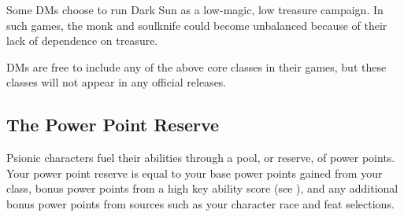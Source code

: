 Some DMs choose to run {\tableheader Dark Sun} as a low-magic, low treasure campaign. In such games, the monk and soulknife could become unbalanced because of their lack of dependence on treasure.

DMs are free to include any of the above core classes in their games, but these classes will not appear in any official releases.

\subsection{The Power Point Reserve}
Psionic characters fuel their abilities through a pool, or reserve, of power points. Your power point reserve is equal to your base power points gained from your class, bonus power points from a high key ability score (see ), and any additional bonus power points from sources such as your character race and feat selections.
















